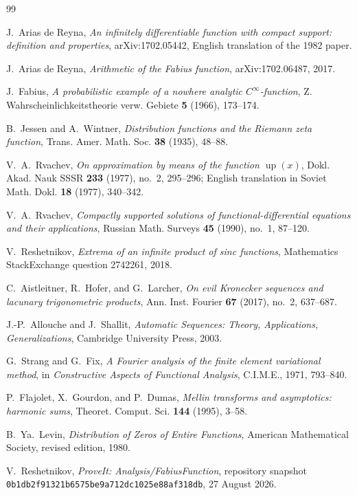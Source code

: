 \documentclass[11pt,oneside]{article}
\numberwithin{equation}{section}
\theoremstyle{definition}
\theoremstyle{remark}
\newcommand{\Up}{\operatorname{up}}
\newcommand{\commit}{\nolinkurl{0b1db2f91321b6575be9a712dc1025e88af318db}}
\begin{document}
\begin{thebibliography}{99}

J.~Arias de Reyna,
\emph{An infinitely differentiable function with compact support: definition and properties},
arXiv:1702.05442, English translation of the 1982 paper.

J.~Arias de Reyna,
\emph{Arithmetic of the Fabius function},
arXiv:1702.06487, 2017.

J.~Fabius,
\emph{A probabilistic example of a nowhere analytic $C^\infty$-function},
Z. Wahrscheinlichkeitstheorie verw. Gebiete \textbf{5} (1966), 173--174.

B.~Jessen and A.~Wintner,
\emph{Distribution functions and the Riemann zeta function},
Trans. Amer. Math. Soc. \textbf{38} (1935), 48--88.

V.~A.~Rvachev,
\emph{On approximation by means of the function $\Up(x)$},
Dokl. Akad. Nauk SSSR \textbf{233} (1977), no.~2, 295--296;
English translation in Soviet Math. Dokl. \textbf{18} (1977), 340--342.

V.~A.~Rvachev,
\emph{Compactly supported solutions of functional-differential equations and their applications},
Russian Math. Surveys \textbf{45} (1990), no.~1, 87--120.

V.~Reshetnikov,
\emph{Extrema of an infinite product of sinc functions},
Mathematics StackExchange question 2742261, 2018.

C.~Aistleitner, R.~Hofer, and G.~Larcher,
\emph{On evil Kronecker sequences and lacunary trigonometric products},
Ann. Inst. Fourier \textbf{67} (2017), no.~2, 637--687.

J.-P.~Allouche and J.~Shallit,
\emph{Automatic Sequences: Theory, Applications, Generalizations},
Cambridge University Press, 2003.

G.~Strang and G.~Fix,
\emph{A Fourier analysis of the finite element variational method},
in \emph{Constructive Aspects of Functional Analysis}, C.I.M.E., 1971, 793--840.

P.~Flajolet, X.~Gourdon, and P.~Dumas,
\emph{Mellin transforms and asymptotics: harmonic sums},
Theoret. Comput. Sci. \textbf{144} (1995), 3--58.

B.~Ya.~Levin,
\emph{Distribution of Zeros of Entire Functions},
American Mathematical Society, revised edition, 1980.

V.~Reshetnikov,
\emph{ProveIt: Analysis/FabiusFunction}, repository snapshot
\commit, 27 August 2026.

\end{thebibliography}
\end{document}
